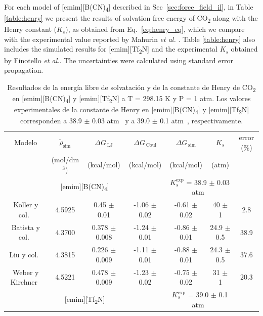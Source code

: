 \documentclass[3p,twocolumn]{elsarticle}
\begin{document}
For each model of [emim][B(CN)\textsubscript{4}] described in Sec~\ref{sec:force_field_il}, in Table \ref{table:henry} we present the results of solvation free energy of CO\textsubscript{2} along with the Henry constant ($K_s$), as obtained from Eq.~\ref{eq:henry_eq}, which we compare with the experimental value reported by Mahurin \textit{et al.} \cite{Mahurin_2010}. Table \ref{table:henry} also includes the simulated results for [emim][Tf\textsubscript{2}N] and the experimental $K_s$ obtained by Finotello \textit{et al.}\cite{Finotello_2008}. The uncertainties were calculated using standard error propagation.

\begin{table}
\centering
\begin{adjustbox}{width=1\textwidth}
\begin{threeparttable}
\caption{Resultados de la energía libre de solvatación y de la constante de Henry de CO\textsubscript{2} en [emim][B(CN)\textsubscript{4}] y [emim][Tf\textsubscript{2}N] a T = 298.15 K y P = 1 atm. Los valores experimentales de la constante de Henry en [emim][B(CN)\textsubscript{4}] y [emim][Tf\textsubscript{2}N] corresponden a 38.9 $\pm$ 0.03 atm~\cite{Mahurin_2010} y a 39.0 $\pm$ 0.1 atm~\cite{Finotello_2008}, respectivamente.}
\begin{tabular}{ c c c  c  c  c  c }  
\toprule
Modelo & $\tilde{\rho}_{\text{sim}}$ & $\Delta G_{\,\text{LJ}}$  & $\Delta G_{\,\text{Coul}}$  & $\Delta G_{\,\text{sim}}$ & $K_{s}$ & error (\%)\tnote{a}\\
& (mol/dm$^{3}$) & (kcal/mol) & (kcal/mol) &  (kcal/mol) & (atm)  &  \\
			\hline
			\multicolumn{4}{c}{[emim][B(CN)\textsubscript{4}]} & \multicolumn{2}{c}{\cellcolor{gray!25}$K_{s}^{\text{exp}}$ = 38.9 $\pm$ 0.03 atm~\cite{Mahurin_2010}}\\
			\hline
Koller y col.~\cite{Koller_2012} & 4.5925 & 0.45 $\pm$ 0.01 & -1.06 $\pm$ 0.02 & -0.61 $\pm$ 0.02 & 40 $\pm$ 1 & 2.8 \\
Batista y col.~\cite{Batista_2015} & 4.3700 & 0.378 $\pm$ 0.008 & -1.24 $\pm$ 0.01  & -0.86 $\pm$ 0.01 & 24.9 $\pm$ 0.5 & 38.9 \\
Liu y col.~\cite{Liu_2014} & 4.3815 & 0.226 $\pm$ 0.009 & -1.11 $\pm$ 0.01 & -0.88 $\pm$ 0.01 & 24.3 $\pm$ 0.5 & 37.6  \\
Weber y Kirchner~\cite{Weber_2016} & 4.5221 & 0.478 $\pm$ 0.009 & -1.23 $\pm$ 0.02 & -0.75 $\pm$ 0.02 & 31 $\pm$ 1 & 20.3  \\
\hline
		\multicolumn{4}{c}{[emim][Tf\textsubscript{2}N]} & \multicolumn{2}{c}{ \cellcolor{gray!25} $K_{s}^{\text{exp}}$ = 39.0 $\pm$ 0.1 atm~\cite{Finotello_2008}}\\

\end{tabular}
\end{threeparttable}
\end{adjustbox}
\end{table}
\end{document}
